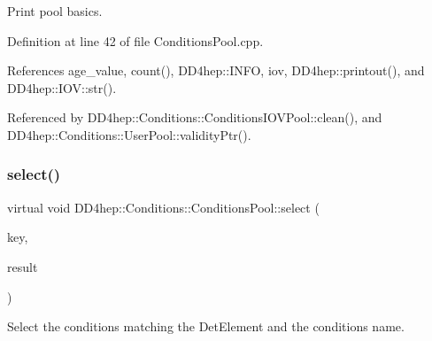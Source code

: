 Print pool basics. 



Definition at line 42 of file Conditions\+Pool.\+cpp.



References age\+\_\+value, count(), D\+D4hep\+::\+I\+N\+FO, iov, D\+D4hep\+::printout(), and D\+D4hep\+::\+I\+O\+V\+::str().



Referenced by D\+D4hep\+::\+Conditions\+::\+Conditions\+I\+O\+V\+Pool\+::clean(), and D\+D4hep\+::\+Conditions\+::\+User\+Pool\+::validity\+Ptr().

\hypertarget{class_d_d4hep_1_1_conditions_1_1_conditions_pool_a742ca5a35a44037e523a7e654924c5eb}{}\label{class_d_d4hep_1_1_conditions_1_1_conditions_pool_a742ca5a35a44037e523a7e654924c5eb} 
\subsubsection{\texorpdfstring{select()}{select()}}
{\footnotesize\ttfamily virtual void D\+D4hep\+::\+Conditions\+::\+Conditions\+Pool\+::select (\begin{DoxyParamCaption}\item[{\hyperlink{class_d_d4hep_1_1_conditions_1_1_condition_a7528efa762e8cc072ef80ea67c3531f9}{Condition\+::key\+\_\+type}}]{key,  }\item[{\hyperlink{namespace_d_d4hep_1_1_conditions_ae765f0140a33973a430280f02b6062f4}{Range\+Conditions} \&}]{result }\end{DoxyParamCaption})\hspace{0.3cm}{\ttfamily [pure virtual]}}



Select the conditions matching the Det\+Element and the conditions name. 

\hypertarget{class_d_d4hep_1_1_conditions_1_1_conditions_pool_ab8a4f19ff244225b1d46f6574aa832cb}{}\label{class_d_d4hep_1_1_conditions_1_1_conditions_pool_ab8a4f19ff244225b1d46f6574aa832cb} 
